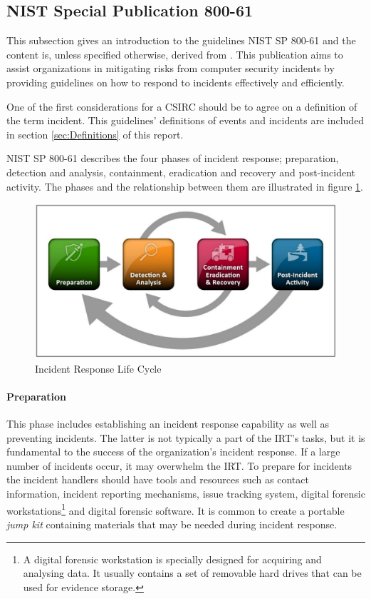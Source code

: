 \subsection{\acs{NIST} Special Publication 800-61}
This subsection gives an introduction to the guidelines \acs{NIST} SP 800-61 and the content is, unless specified otherwise, derived from \cite{nist800-61}. This publication aims to  assist organizations in mitigating risks from computer security incidents by providing guidelines on how to respond to incidents effectively and efficiently. 

One of the first considerations for a \ac{CSIRC} should be to agree on a definition of the term incident. This guidelines' definitions of events and incidents are included in section \ref{sec:Definitions} of this report. 

\acs{NIST} SP 800-61 describes the four phases of incident response; preparation, detection and analysis, containment, eradication and recovery and post-incident activity. The phases and the relationship between them are illustrated in figure \ref{fig:NISTIncidentResponse}.

\begin{figure}[ht]
\begin{center}
\includegraphics[scale=0.27]{NISTIncidentResponseCycle.png}
\caption[NIST Incident Response Life Cycle]{Incident Response Life Cycle \cite{nist800-61}}
\label{fig:NISTIncidentResponse}
\end{center}
\end{figure}

\paragraph{Preparation} 
This phase includes establishing an incident response capability as well as preventing incidents. The latter is not typically a part of the \ac{IRT}'s tasks, but it is fundamental to the success of the organization's incident response. If a large number of incidents occur, it may overwhelm the \ac{IRT}. To prepare for incidents the incident handlers should have tools and resources such as contact information, incident reporting mechanisms, issue tracking system, digital forensic workstations\footnote{A digital forensic workstation is specially designed for acquiring and analysing data. It usually contains a set of removable hard drives that can be used for evidence storage.} and digital forensic software. It is common to create a portable \emph{jump kit} containing materials that may be needed during incident response.

